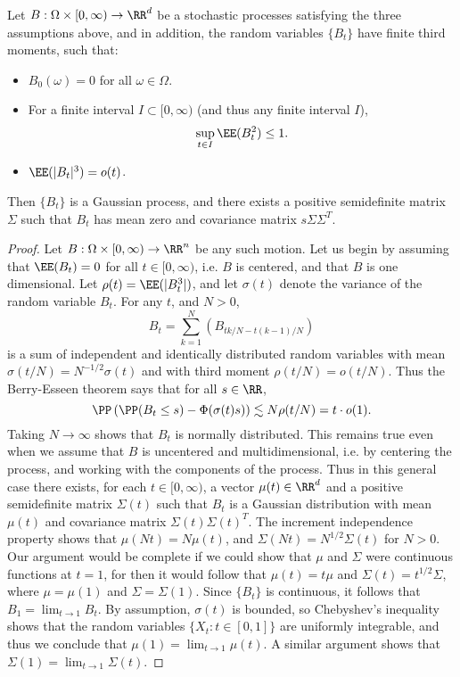 \begin{lemma}
    Let $B: \Omega \times [0,\infty) \to \RR^d$ be a stochastic processes satisfying the three assumptions above, and in addition, the random variables $\{ B_t \}$ have finite third moments, such that:
    \begin{itemize}
        \item $B_0(\omega) = 0$ for all $\omega \in \Omega$.
        \item For a finite interval $I \subset [0,\infty)$ (and thus any finite interval $I$),
        \[ \sup_{t \in I} \EE(B_t^2) \leq 1. \]
        \item $\EE(|B_t|^3) = o(t)$.
    \end{itemize}
    Then $\{ B_t \}$ is a Gaussian process, and there exists a positive semidefinite matrix $\Sigma$ such that $B_t$ has mean zero and covariance matrix $s \Sigma \Sigma^T$.
\end{lemma}
\begin{proof}
    Let $B: \Omega \times [0,\infty) \to \RR^n$ be any such motion. Let us begin by assuming that $\EE(B_t) = 0$ for all $t \in [0,\infty)$, i.e. $B$ is centered, and that $B$ is one dimensional. Let $\rho(t) = \EE(|B_t^3|)$, and let $\sigma(t)$ denote the variance of the random variable $B_t$. For any $t$, and $N > 0$,
    \[ B_t = \sum_{k = 1}^N (B_{tk/N - t(k-1)/N}) \]
    is a sum of independent and identically distributed random variables with mean $\sigma(t/N) = N^{-1/2} \sigma(t)$ and with third moment $\rho(t/N) = o(t/N)$. Thus the Berry-Esseen theorem says that for all $s \in \RR$,
    \[ \PP \left( \PP( B_t \leq s ) - \Phi( \sigma(t) s) \right) \lesssim N \rho(t/N) = t \cdot o(1). \]
    Taking $N \to \infty$ shows that $B_t$ is normally distributed. This remains true even when we assume that $B$ is uncentered and multidimensional, i.e. by centering the process, and working with the components of the process. Thus in this general case there exists, for each $t \in [0,\infty)$, a vector $\mu(t) \in \RR^d$ and a positive semidefinite matrix $\Sigma(t)$ such that $B_t$ is a Gaussian distribution with mean $\mu(t)$ and covariance matrix $\Sigma(t) \Sigma(t)^T$. The increment independence property shows that $\mu(Nt) = N \mu(t)$, and $\Sigma(Nt) = N^{1/2} \Sigma(t)$ for $N > 0$. Our argument would be complete if we could show that $\mu$ and $\Sigma$ were continuous functions at $t = 1$, for then it would follow that $\mu(t) = t \mu$ and $\Sigma(t) = t^{1/2} \Sigma$, where $\mu = \mu(1)$ and $\Sigma = \Sigma(1)$. Since $\{ B_t \}$ is continuous, it follows that $B_1 = \lim_{t \to 1} B_t$. By assumption, $\sigma(t)$ is bounded, so Chebyshev's inequality shows that the random variables $\{ X_t: t \in [0,1] \}$ are uniformly integrable, and thus we conclude that $\mu(1) = \lim_{t \to 1} \mu(t)$. A similar argument shows that $\Sigma(1) = \lim_{t \to 1} \Sigma(t)$.
\end{proof}

